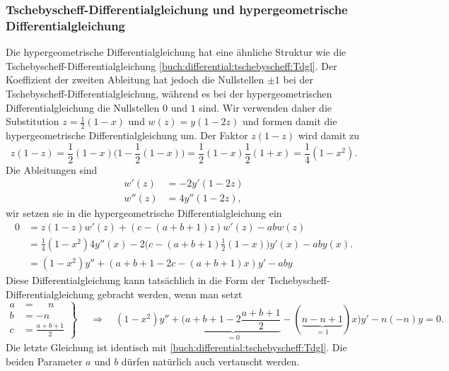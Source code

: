 \subsubsection{Tschebyscheff-Differentialgleichung und hypergeometrische
Differentialgleichung}
Die hypergeometrische Differentialgleichung hat eine ähnliche Struktur
wie die Tschebyscheff-Differentialgleichung
\eqref{buch:differential:tschebyscheff:Tdgl}.
Der Koeffizient der zweiten Ableitung hat jedoch die Nullstellen
$\pm 1$ bei der Tschebyscheff-Differentialgleichung, während es bei
der hypergeometrischen Differentialgleichung die Nullstellen
$0$ und $1$ sind.
Wir verwenden daher die Substitution $z = \frac12(1-x)$ und 
$w(z)=y(1-2z)$ und formen damit die hypergeometrische
Differentialgleichung um.
Der Faktor $z(1-z)$ wird damit zu
\[
z(1-z)
=
\frac12(1-x)\biggl(1-\frac12(1-x)\biggr)
=
\frac12(1-x) \frac12(1+x)
=
\frac14 (1-x^2).
\]
Die Ableitungen sind 
\begin{align*}
w'(z) &= -2y'(1-2z) \\
w''(z) &= 4y''(1-2z),
\end{align*}
wir setzen sie in die hypergeometrische Differentialgleichung ein
\begin{align*}
0
&=
z(1-z) w'(z) 
+
(c-(a+b+1)z) w'(z) - ab w(z)
\\
&=
\frac14(1-x^2) 4y''(x)
-
2
\biggl(c-(a+b+1)\frac12(1-x)\biggr)
y'(x)
-aby(x).
\\
&=
(1-x^2)y''
+
(a+b+1-2c-(a+b+1)x) y'
-
aby
\end{align*}
Diese Differentialgleichung kann tatsächlich in die Form der 
Tschebyscheff-Differentialgleichung gebracht werden, wenn man setzt
\begin{equation}
\left.
\begin{aligned}
a&=\phantom{-}n\\
b&=-n\\
c&=\frac{a+b+1}2
\end{aligned}
\right\}
\;
\quad\Rightarrow\quad
(1-x^2)y''+
\biggl(\underbrace{a+b+1-2\frac{a+b+1}2}_{\displaystyle=0}-(\underbrace{n-n+1}_{\displaystyle=1})x\biggr)y'
-n(-n)y=0.
\end{equation}
Die letzte Gleichung ist identisch mit
\eqref{buch:differential:tschebyscheff:Tdgl}.
Die beiden Parameter $a$ und $b$ dürfen natürlich auch vertauscht
werden.

